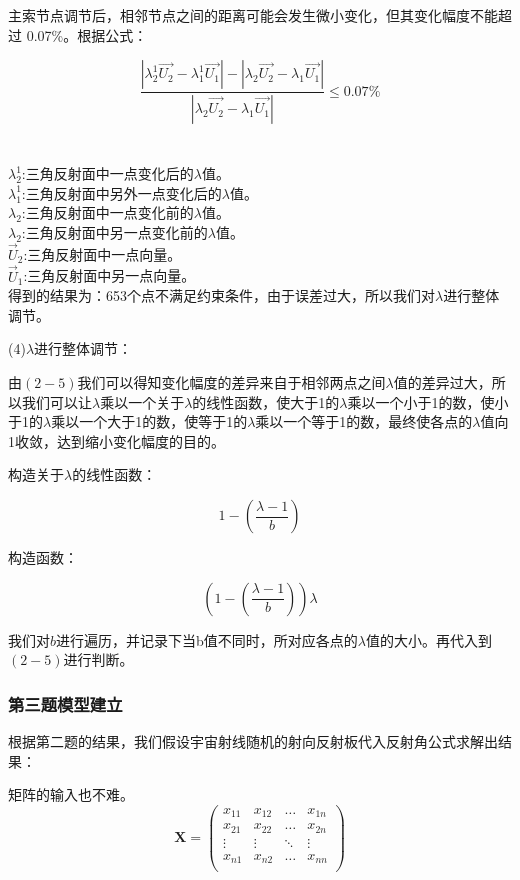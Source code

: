 \documentclass[withoutpreface,bwprint]{cumcmthesis} %
\numberwithin{equation}{subsection}
\begin{document}
主索节点调节后，相邻节点之间的距离可能会发生微小变化，但其变化幅度不能超过 0.07\%。根据公式：

\begin{equation}
	\frac{|\lambda_2^{1}\vec{U_2}-\lambda_1^{1}\vec{U_1}|-|\lambda_2\vec{U_2}-\lambda_1\vec{U_1}|}{|\lambda_2\vec{U_2}-\lambda_1\vec{U_1}|}\le0.07\%
\end{equation} \\
\\
$\lambda_2^{1}$:三角反射面中一点变化后的$\lambda$值。\\
$\lambda_1^{1}$:三角反射面中另外一点变化后的$\lambda$值。\\
$\lambda_2$:三角反射面中一点变化前的$\lambda$值。\\
$\lambda_2$:三角反射面中另一点变化前的$\lambda$值。\\
$\vec{U}_2$:三角反射面中一点向量。\\
$\vec{U}_1$:三角反射面中另一点向量。\\

得到的结果为：653个点不满足约束条件，由于误差过大，所以我们对$\lambda$进行整体调节。

(4)$\lambda$进行整体调节：

由$(2-5)$我们可以得知变化幅度的差异来自于相邻两点之间$\lambda$值的差异过大，所以我们可以让$\lambda$乘以一个关于$\lambda$的线性函数，使大于1的$\lambda$乘以一个小于1的数，使小于1的$\lambda$乘以一个大于1的数，使等于1的$\lambda$乘以一个等于1的数，最终使各点的$\lambda$值向1收敛，达到缩小变化幅度的目的。

构造关于$\lambda$的线性函数：

\begin{equation}
1-(\frac{\lambda-1}{b})
\end{equation}

构造函数：

\begin{equation}
	(1-(\frac{\lambda-1}{b}))\lambda
\end{equation}

我们对$b$进行遍历，并记录下当b值不同时，所对应各点的$\lambda$值的大小。再代入到$(2-5)$进行判断。

\subsubsection{第三题模型建立}

根据第二题的结果，我们假设宇宙射线随机的射向反射板代入反射角公式求解出结果：


矩阵的输入也不难。
\[
\mathbf{X} = \left(
    \begin{array}{cccc}
    x_{11} & x_{12} & \ldots & x_{1n}\\
    x_{21} & x_{22} & \ldots & x_{2n}\\
    \vdots & \vdots & \ddots & \vdots\\
    x_{n1} & x_{n2} & \ldots & x_{nn}\\
    \end{array} \right)
\]
\end{document}
